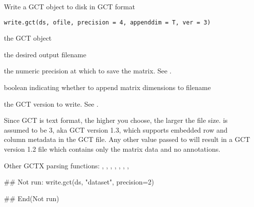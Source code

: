 \documentclass[letterpaper]{book}
\begin{document}
%
\begin{Description}\relax
Write a GCT object to disk in GCT format
\end{Description}
%
\begin{Usage}
\begin{verbatim}
write.gct(ds, ofile, precision = 4, appenddim = T, ver = 3)
\end{verbatim}
\end{Usage}
%
\begin{Arguments}
\begin{ldescription}
\item[\code{ds}] the GCT object

\item[\code{ofile}] the desired output filename

\item[\code{precision}] the numeric precision at which to
save the matrix. See .

\item[\code{appenddim}] boolean indicating whether to append
matrix dimensions to filename

\item[\code{ver}] the GCT version to write. See .
\end{ldescription}
\end{Arguments}
%
\begin{Details}\relax
Since GCT is text format, the higher 
you choose, the larger the file size.
 is assumed to be 3, aka GCT version 1.3, which supports
embedded row and column metadata in the GCT file. Any other value
passed to  will result in a GCT version 1.2 file which
contains only the matrix data and no annotations.
\end{Details}
%
\begin{SeeAlso}\relax
Other GCTX parsing functions: ,
, ,
, ,
,
, 
\end{SeeAlso}
%
\begin{Examples}
\begin{ExampleCode}
## Not run: 
write.gct(ds, "dataset", precision=2)

## End(Not run)
\end{ExampleCode}
\end{Examples}
\end{document}

